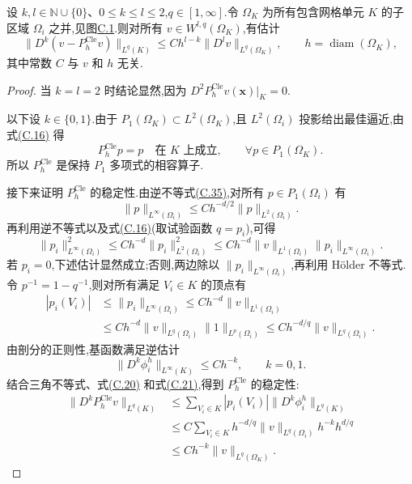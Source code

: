 \begin{theorem}[插值估计]\label{thm:appendix-c-18}
设 $k,l\in\mathbb N\cup\{0\}$、$0\le k\le l\le2$,$q\in[1,\infty]$.令 $\Omega_K$ 为所有包含网格单元 $K$ 的子区域 $\Omega_i$ 之并,见图\hyperref[fig:appendix-c-1]{C.1}.则对所有 $v\in W^{l,q}(\Omega_K)$,有估计
\begin{equation}\label{eq:appendix-c-18}
 \|D^k(v-P_h^{\mathrm{Cle}}v)\|_{L^q(K)}
 \le Ch^{l-k}\|D^l v\|_{L^q(\Omega_K)},
 \qquad h=\operatorname{diam}(\Omega_K),
\end{equation}
其中常数 $C$ 与 $v$ 和 $h$ 无关.
\end{theorem}

\begin{proof}
当 $k=l=2$ 时结论显然,因为
$D^2P_h^{\mathrm{Cle}}v(\bm x)|_K=0$.

以下设 $k\in\{0,1\}$.由于 $P_1(\Omega_K)\subset L^2(\Omega_K)$,且 $L^2(\Omega_i)$ 投影给出最佳逼近,由式\hyperref[eq:appendix-c-16]{(C.16)} 得
\begin{equation}\label{eq:appendix-c-19}
 P_h^{\mathrm{Cle}}p=p\quad\text{在 }K\text{ 上成立},
 \qquad \forall p\in P_1(\Omega_K).
\end{equation}
所以 $P_h^{\mathrm{Cle}}$ 是保持 $P_1$ 多项式的相容算子.

接下来证明 $P_h^{\mathrm{Cle}}$ 的稳定性.由逆不等式\hyperref[eq:appendix-c-35]{(C.35)},对所有 $p\in P_1(\Omega_i)$ 有
\[
 \|p\|_{L^\infty(\Omega_i)}
 \le Ch^{-d/2}\|p\|_{L^2(\Omega_i)}.
\]
再利用逆不等式以及式\hyperref[eq:appendix-c-16]{(C.16)}(取试验函数 $q=p_i$),可得
\[
 \|p_i\|_{L^\infty(\Omega_i)}^2
 \le Ch^{-d}\|p_i\|_{L^2(\Omega_i)}^2
 \le Ch^{-d}\|v\|_{L^1(\Omega_i)}
       \|p_i\|_{L^\infty(\Omega_i)}.
\]
若 $p_i=0$,下述估计显然成立;否则,两边除以
$\|p_i\|_{L^\infty(\Omega_i)}$,再利用 Hölder 不等式.令 $p^{-1}=1-q^{-1}$,则对所有满足 $V_i\in K$ 的顶点有
\begin{equation}\label{eq:appendix-c-20}
\begin{aligned}
 |p_i(V_i)|
 &\le\|p_i\|_{L^\infty(\Omega_i)}
 \le Ch^{-d}\|v\|_{L^1(\Omega_i)}\\
 &\le Ch^{-d}\|v\|_{L^q(\Omega_i)}
       \|1\|_{L^p(\Omega_i)}
 \le Ch^{-d/q}\|v\|_{L^q(\Omega_i)}.
\end{aligned}
\end{equation}
由剖分的正则性,基函数满足逆估计
\begin{equation}\label{eq:appendix-c-21}
 \|D^k\phi_i^h\|_{L^\infty(K)}\le Ch^{-k},
 \qquad k=0,1.
\end{equation}
结合三角不等式、式\hyperref[eq:appendix-c-20]{(C.20)} 和式\hyperref[eq:appendix-c-21]{(C.21)},得到 $P_h^{\mathrm{Cle}}$ 的稳定性:
\begin{equation}\label{eq:appendix-c-22}
\begin{aligned}
 \|D^kP_h^{\mathrm{Cle}}v\|_{L^q(K)}
 &\le\sum_{V_i\in K}|p_i(V_i)|
     \|D^k\phi_i^h\|_{L^q(K)}\\
 &\le C\sum_{V_i\in K}h^{-d/q}\|v\|_{L^q(\Omega_i)}
     h^{-k}h^{d/q}\\
 &\le Ch^{-k}\|v\|_{L^q(\Omega_K)}.
\end{aligned}
\end{equation}


\end{proof}
